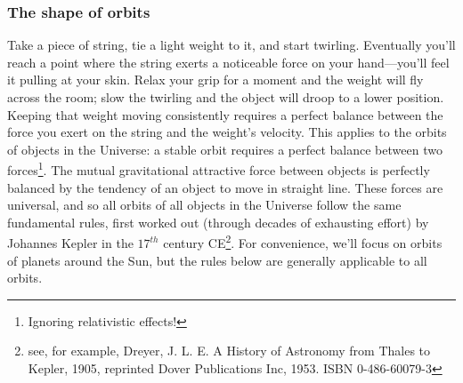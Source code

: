 \subsubsection{The shape of orbits}
Take a piece of string, tie a light weight to it, and start twirling. Eventually you'll reach a point where the string exerts a noticeable force on your hand---you'll feel it pulling at your skin. Relax your grip for a moment and the weight will fly across the room; slow the twirling and the object will droop to a lower position. Keeping that weight moving consistently requires a perfect balance between the force you exert on the string and the weight's velocity. This applies to the orbits of objects in the Universe: a stable orbit requires a perfect balance between two forces\footnote{Ignoring relativistic effects!}. The mutual gravitational attractive force between objects is perfectly balanced by the tendency of an object to move in  straight line. These forces are universal, and so all orbits of all objects in the Universe follow the same fundamental rules, first worked out (through decades of exhausting effort) by Johannes Kepler in the $17^{th}$ century CE\footnote{see, for example, Dreyer, J. L. E. A History of Astronomy from Thales to Kepler, 1905, reprinted Dover Publications Inc, 1953. ISBN 0-486-60079-3}. For convenience, we'll focus on orbits of planets around the Sun, but the rules below are generally applicable to all orbits.\\ 

